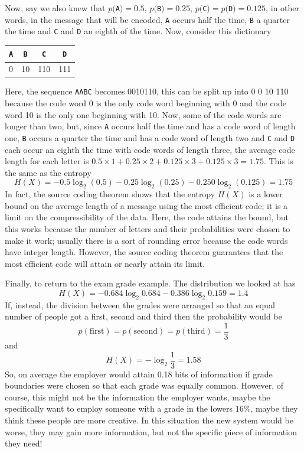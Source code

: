 \documentclass[12pt]{article}
\begin{document}
Now, say we also knew that $p($\texttt{A}$)=0.5$, $p($\texttt{B}$)=0.25$,
$p($\texttt{C}$)=p($\texttt{D}$)=0.125$, in other words, in the message that will be
encoded, \texttt{A} occurs half the time, \texttt{B} a quarter the time and \texttt{C} and \texttt{D} an
eighth of the time. Now, consider this dictionary
\begin{center}
\begin{tabular}{cccc}
\texttt{A}&\texttt{B}&\texttt{C}&\texttt{D}\\
\hline
0&10&110&111
\end{tabular}
\end{center}
Here, the sequence \texttt{AABC} becomes 0010110, this can be split up into 0
0 10 110 because the code word 0 is the only code word beginning
with 0 and the code word 10 is the only one beginning with 10. Now,
some of the code words are longer than two, but, since \texttt{A} occurs half
the time and has a code word of length one, \texttt{B} occurs a quarter the
time and has a code word of length two and \texttt{C} and \texttt{D} each occur an
eighth the time with code words of length three, the average code
length for each letter is $0.5\times 1 +0.25\times 2 + 0.125\times 3 +
0.125\times 3=1.75$. This is the same as the entropy
\begin{equation}
H(X)=-0.5\log_2(0.5)-0.25\log_2(0.25)-0.250\log_2(0.125)=1.75
\end{equation}
In fact, the source coding theorem shows that the entropy $H(X)$ is
a lower bound on the average length of a message using the most
efficient code; it is a limit on the compressibility of the
data. Here, the code attains the bound, but this works because the
number of letters and their probabilities were chosen to make it work;
usually there is a sort of rounding error because the code words have
integer length. However, the source coding theorem guarantees that the
most efficient code will attain or nearly attain its limit.

Finally, to return to the exam grade example. The distribution we looked at has
\begin{equation}
H(X)=-0.684\log_2{0.684}-0.386\log_2{0.159}=1.4
\end{equation}
If, instead, the division between the grades were arranged so that an equal number of people got a first, second and third then the probability would be 
\begin{equation}
p(\mbox{first})=p(\mbox{second})=p(\mbox{third})=\frac{1}{3}
\end{equation}
and
\begin{equation}
H(X)=-\log_2\frac{1}{3}=1.58
\end{equation}
So, on average the employer would attain 0.18 bits of information if
grade boundaries were chosen so that each grade was equally
common. However, of course, this might not be the information the
employer wants, maybe the specifically want to employ someone with a
grade in the lowers $16\%$, maybe they think these people are more
creative. In this situation the new system would be worse, they may
gain more information, but not the specific piece of information they
need!
\end{document}
